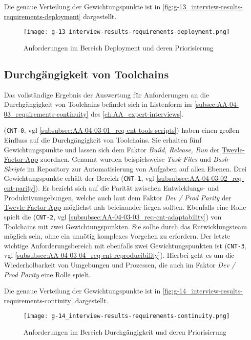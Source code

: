 Die genaue Verteilung der Gewichtungspunkte ist in \autoref{fig:g-13_interview-results-requirements-deployment} dargestellt.

\begin{figure}[h]
    \centering
    \texttt{[image: g-13\_interview-results-requirements-deployment.png]}
    \caption{Anforderungen im Bereich Deployment und deren Priorisierung}
    \label{fig:g-13_interview-results-requirements-deployment}
\end{figure}

\subsection{Durchgängigkeit von Toolchains}
\label{subsec:04-02-04_consistency-of-toolchains}

Das vollständige Ergebnis der Auswertung für Anforderungen an die Durchgängigkeit von Toolchains befindet sich in Listenform im \autoref{subsec:AA-04-03_requirements-continuity} des \autoref{ch:AA_expert-interviews}.

\textbf{} (\texttt{CNT-0}, \acrshort{vgl} \autoref{subsubsec:AA-04-03-01_req-cnt-tools-scripts}) haben einen großen Einfluss auf die Durchgängigkeit von Toolchains. Sie erhalten fünf Gewichtungspunkte und lassen sich dem Faktor \textit{Build, Release, Run} der \hyperref[sec:03-05_concept-of-twelve-factor-app]{Twevle-Factor-App} zuordnen. Genannt wurden beispielsweise \textit{Task-Files} und \textit{Bash-Skripte} im Repository zur Automatisierung von Aufgaben auf allen Ebenen. Drei Gewichtungspunkte erhält der Bereich \textbf{} (\texttt{CNT-1}, \acrshort{vgl} \autoref{subsubsec:AA-04-03-02_req-cnt-parity}). Er bezieht sich auf die Parität zwischen Entwicklungs- und Produktivumgebungen, welche auch laut dem Faktor \textit{Dev / Prod Parity} der \hyperref[sec:03-05_concept-of-twelve-factor-app]{Twevle-Factor-App} möglichst nah beieinander liegen sollten. Ebenfalls eine Rolle spielt die \textbf{} (\texttt{CNT-2}, \acrshort{vgl} \autoref{subsubsec:AA-04-03-03_req-cnt-adaptability}) von Toolchains mit zwei Gewichtungspunkten. Sie sollte durch das Entwicklungsteam möglich sein, ohne ein unnötig komplexes Vorgehen zu erfordern. Der letzte wichtige Anforderungsbereich mit ebenfalls zwei Gewichtungspunkten ist \textbf{} (\texttt{CNT-3}, \acrshort{vgl} \autoref{subsubsec:AA-04-03-04_req-cnt-reproducibility}). Hierbei geht es um die Wiederholbarkeit von Umgebungen und Prozessen, die auch im Faktor \textit{Dev / Prod Parity} eine Rolle spielt.

Die genaue Verteilung der Gewichtungspunkte ist in \autoref{fig:g-14_interview-results-requirements-contiuity} dargestellt.

\begin{figure}[h]
    \centering
    \texttt{[image: g-14\_interview-results-requirements-continuity.png]}
    \caption{Anforderungen im Bereich Durchgängigkeit und deren Priorisierung}
    \label{fig:g-14_interview-results-requirements-contiuity}
\end{figure}

